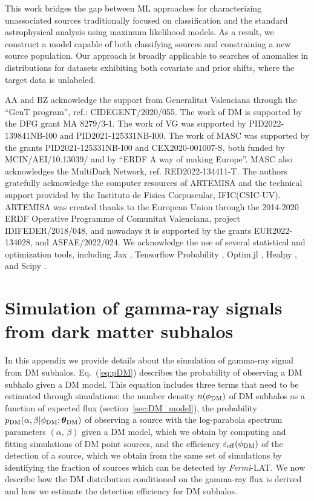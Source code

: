 \documentclass[12pt, a4paper]{article}
\newcommand{\Fermi}{{\sl Fermi}}
\newcommand{\btheta}{\boldsymbol{\theta}}
\begin{document}
This work bridges the gap between ML approaches for characterizing unassociated sources traditionally focused on classification and the standard astrophysical analysis using maximum likelihood models. As a result, we construct a model capable of both classifying sources and constraining a new source population. 
Our approach is broadly applicable to searches of anomalies in distributions for datasets exhibiting both covariate and prior shifts, where the target data is unlabeled.

\acknowledgments
%
AA and BZ acknowledge the support from Generalitat Valenciana through the “GenT program”, ref.: CIDEGENT/2020/055.
The work of DM is supported by the DFG grant MA 8279/3-1. 
The work of VG was supported by PID2022-139841NB-I00 and PID2021-125331NB-I00. 
The work of MASC was supported by the grants PID2021-125331NB-I00 and CEX2020-001007-S, both funded by MCIN/AEI/10.13039/ 
and by ``ERDF A way of making Europe''. MASC also acknowledges the MultiDark Network, ref. RED2022-134411-T. 
The authors gratefully acknowledge the computer resources  of ARTEMISA and the technical support provided by the Instituto de Fisica Corpuscular, IFIC(CSIC-UV). ARTEMISA was created thanks to the European Union through the 2014-2020 ERDF Operative Programme of Comunitat Valenciana, project IDIFEDER/2018/048, and nowadays it is supported by the grants
EUR2022-134028, and ASFAE/2022/024. 
We acknowledge the use of several statistical and optimization tools, including Jax \cite{jax}, Tensorflow Probability \cite{tensorflow2015-whitepaper}, Optim.jl \cite{mogensen2018optim}, Healpy \cite{healpy}, and Scipy \cite{scipy}.




\pagebreak

\appendix


\section{Simulation of gamma-ray signals from dark matter subhalos}
\label{app:sim-ps}

In this appendix we provide details about the simulation of gamma-ray signal from DM subhalos.
Eq.~(\ref{eq:pDM}) describes the probability of observing a DM subhalo 
given a DM model.
This equation includes three terms that need to be estimated through simulations: 
the number density $n(\phi_{\rm DM})$ of DM subhalos as a function of expected flux (section~\ref{sec:DM_model}), the probability $p_{\rm DM}(\alpha,\beta|\phi_{\rm DM};\btheta_{\rm DM})$  of observing a source with the log-parabola spectrum parameters $(\alpha,\,\beta)$ given a DM model, which we obtain by computing and fitting simulations of DM point sources, and the efficiency $\varepsilon_{\rm eff}(\phi_{\rm DM})$ of the detection of a source, which we obtain from the same set of simulations by identifying the fraction of sources which can be detected by \Fermi-LAT.  
We now describe how the DM distribution conditioned on the gamma-ray flux is derived and how we estimate the detection efficiency for DM subhalos.
\end{document}
